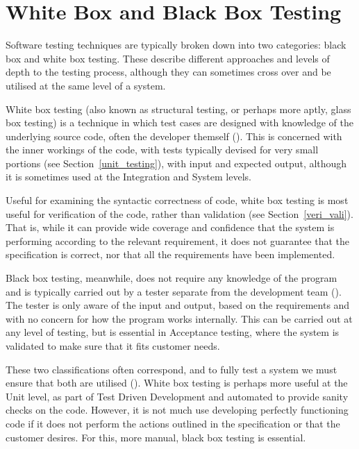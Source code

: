 \documentclass[12pt]{article}
\begin{document}
\section{White Box and Black Box Testing} \label{blackwhitebox}

Software testing techniques are typically broken down into two categories: black box and white box testing. These describe different approaches and levels of depth to the testing process, although they can sometimes cross over and be utilised at the same level of a system.

White box testing (also known as structural testing, or perhaps more aptly, glass box testing) is a technique in which test cases are designed with knowledge of the underlying source code, often the developer themself (). This is concerned with the inner workings of the code, with tests typically devised for very small portions (see Section~\ref{unit_testing}), with input and expected output, although it is sometimes used at the Integration and System levels.

Useful for examining the syntactic correctness of code, white box testing is most useful for verification of the code, rather than validation (see Section~\ref{veri_vali}). That is, while it can provide wide coverage and confidence that the system is performing according to the relevant requirement, it does not guarantee that the specification is correct, nor that all the requirements have been implemented.

Black box testing, meanwhile, does not require any knowledge of the program and is typically carried out by a tester separate from the development team (). The tester is only aware of the input and output, based on the requirements and with no concern for how the program works internally. This can be carried out at any level of testing, but is essential in Acceptance testing, where the system is validated to make sure that it fits customer needs. 

These two classifications often correspond, and to fully test a system we must ensure that both are utilised (). White box testing is perhaps more useful at the Unit level, as part of Test Driven Development and automated to provide sanity checks on the code. However, it is not much use developing perfectly functioning code if it does not perform the actions outlined in the specification or that the customer desires. For this, more manual, black box testing is essential.
\end{document}
